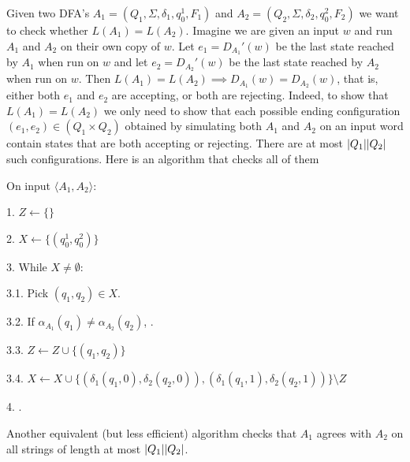 Given two DFA's \(A_1 = (Q_1,\Sigma,\delta_1,q_0^1,F_1)\) and \(A_2 =
(Q_2,\Sigma,\delta_2,q_0^2,F_2)\) we want to check whether \(L(A_1) =
L(A_2)\). Imagine we are given an input \(w\) and run \(A_1\) and \(A_2\)
on their own copy of \(w\). Let \(e_1 = D_{A_1}'(w)\) be the last state reached by
\(A_1\) when run on \(w\) and let \(e_2 = D_{A_2}'(w)\) be the last state reached
by \(A_2\) when run on \(w\). Then \(L(A_1) = L(A_2) \implies D_{A_1}(w) =
D_{A_2}(w)\), that is, either both \(e_1\) and \(e_2\) are accepting, or
both are rejecting. Indeed, to show that \(L(A_1) = L(A_2)\) we only need to
show that each possible ending configuration \((e_1,e_2) \in (Q_1 \times Q_2)\) obtained by
simulating both \(A_1\) and \(A_2\) on an input word contain states that are
both accepting or rejecting. There are at most \(|Q_1| |Q_2|\) such
configurations. Here is an algorithm that checks all of them
\begin{TMachine}{On input \(\langle A_1, A_2 \rangle\):}
\item[1.] \(Z \gets \{\}\)
\item[2.] \(X \gets \{(q_0^1,q_0^2)\}\)
\item[3.] While \(X \neq \emptyset\):
\item[3.1.] Pick \((q_1,q_2) \in X\).
\item[3.2.] If \(\alpha_{A_1}(q_1) \neq \alpha_{A_2}(q_2)\), \reject.
\item[3.3.] \(Z \gets Z \cup \{(q_1,q_2)\}\)
\item[3.4.] \(X \gets X \cup
\{(\delta_1(q_1,0),\delta_2(q_2,0)),(\delta_1(q_1,1),\delta_2(q_2,1))\}
\setminus Z\)
\item[4.] \accept.
\end{TMachine}
Another equivalent (but less efficient) algorithm checks that \(A_1\) agrees
with \(A_2\) on all strings of length at most \(|Q_1| |Q_2|\).

